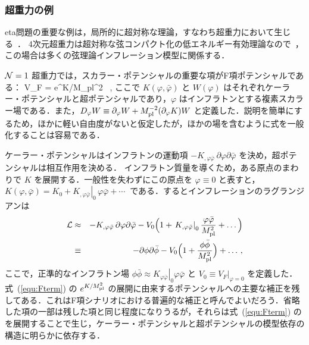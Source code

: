 \subsubsection{超重力の例}
\label{sec:sugraETA}

eta問題の重要な例は，局所的に超対称な理論，すなわち超重力において生じる~\cite{Copeland:1994vg}．
4次元超重力は超対称な弦コンパクト化の低エネルギー有効理論なので~\cite{PolchinskiOne, Polchinski}，この場合は多くの弦理論インフレーション模型に関係する．

${\cal N} = 1$ 超重力では，スカラー・ポテンシャルの重要な項がF項ポテンシャルである：
\beq
\label{equ:Fterm}
 V_F = e^{K/M_{\rm pl}^2} \, ,
\eeq
ここで $K(\varphi, \bar \varphi)$ と $W(\varphi)$ はそれぞれケーラー・ポテンシャルと超ポテンシャルであり，$\varphi$ はインフラトンとする複素スカラー場である．また，$D_{\varphi}W \equiv \partial_{\varphi} W + M_{\rm pl}^{-2}(\partial_{\varphi} K) W$ と定義した．説明を簡単にするため，ほかに軽い自由度がないと仮定したが，ほかの場を含むように式を一般化することは容易である．

ケーラー・ポテンシャルはインフラトンの運動項 $-K_{,\varphi \bar \varphi} \, \partial \varphi \partial \bar \varphi$ を決め，超ポテンシャルは相互作用を決める．
インフラトン質量を導くため，ある原点のまわりで $K$ を展開する．一般性を失わずにこの原点を $\varphi \equiv 0$ と表すと，$K(\varphi, \bar \varphi) = K_0 + \left. K_{,\varphi \bar \varphi}\right|_0 \, \varphi \bar \varphi + \cdots\ $ である．するとインフレーションのラグランジアンは
\begin{eqnarray}
{\cal L} &\approx& - K_{,\varphi \bar \varphi}\, \partial \varphi  \partial \bar \varphi -  V_0 \Bigl(1+ \left. K_{,\varphi \bar \varphi}\right|_0 \frac{\varphi \bar \varphi}{M_{\rm pl}^2} + \dots \Bigr) \\
&\equiv& -  \partial \phi \partial \bar\phi - V_0 \Bigl(1+  \frac{\phi \bar \phi}{M_{\rm pl}^2} \Bigr) + \dots\, , \label{equ:mid}
\end{eqnarray}
ここで，正準的なインフラトン場 $\phi\bar\phi \approx  \left. K_{\varphi \bar \varphi}\right|_0 \varphi \bar \varphi$ と $V_0 \equiv \left. V_F\right|_{\varphi =0}$ を定義した．
式~(\ref{equ:Fterm}) の $e^{K/M_{\rm pl}^2}$ の展開に由来するポテンシャルへの主要な補正を残してある．これはF項シナリオにおける普遍的な補正と呼んでよいだろう．省略した項の一部は残した項と同じ程度になりうるが，それらは式~(\ref{equ:Fterm}) の
\beq{}
\label{equ:md}
\eeq を展開することで生じ，ケーラー・ポテンシャルと超ポテンシャルの模型依存の構造に明らかに依存する．


